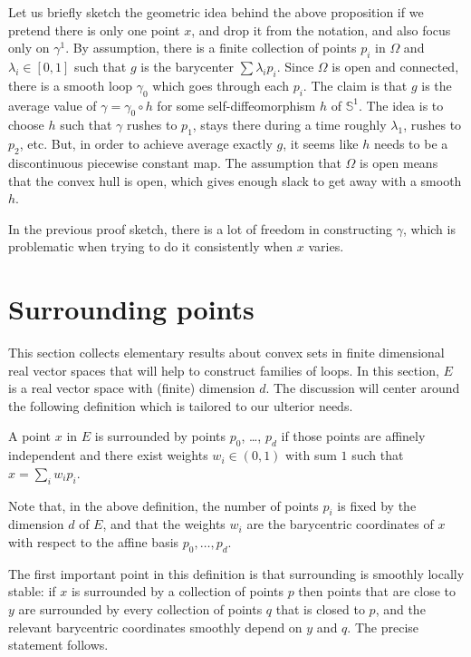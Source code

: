 Let us briefly sketch the geometric idea behind the above proposition
if we pretend there is only one point $x$, and drop it from the
notation, and also focus only on $γ^1$.
By assumption, there is a finite collection of points $p_i$ in $Ω$ and $λ_i ∈
[0, 1]$ such that $g$ is the barycenter $\sum λ_i p_i$. Since $Ω$ is open and
connected, there is a smooth loop $γ_0$ which goes through each $p_i$. The
claim is that $g$ is the average value of $γ = γ_0 ∘ h$ for some
self-diffeomorphism $h$ of $𝕊^1$. The idea is to choose $h$ such that
$γ$ rushes to $p_1$, stays there during a time roughly $λ_1$, rushes to
$p_2$, etc. But, in order to achieve average exactly $g$, it seems like $h$
needs to be a discontinuous piecewise constant map. The assumption that $Ω$ is
open means that the convex hull is open, which gives enough slack to get away with
a smooth $h$.

In the previous proof sketch, there is a lot of freedom in constructing $γ$,
which is problematic when trying to do it consistently when $x$ varies.

\section{Surrounding points}
\label{sec:preliminaries}

This section collects elementary results about convex sets in finite
dimensional real vector spaces that will help to construct families of loops.
In this section, $E$ is a real vector space with (finite) dimension $d$.
The discussion will center around the following definition which is tailored to
our ulterior needs.

\begin{definition}
  \label{def:surrounds_points}
  \leanok
  A point $x$ in $E$
  is surrounded by points $p_0$, \dots, $p_d$ if those points are
  affinely independent and there exist weights $w_i ∈ (0, 1)$ with sum $1$
  such that $x = \sum_i w_i p_i$.
\end{definition}

Note that, in the above definition, the number of points $p_i$ is fixed
by the dimension $d$ of $E$, and that the weights $w_i$ are the barycentric
coordinates of $x$ with respect to the affine basis $p_0, \ldots, p_d$.

The first important point in this definition is that surrounding is
smoothly locally stable: if $x$ is surrounded by a collection of points $p$
then points that are close to $y$ are surrounded by every collection of points
$q$ that is closed to $p$, and the relevant barycentric coordinates smoothly
depend on $y$ and $q$. The precise statement follows.

